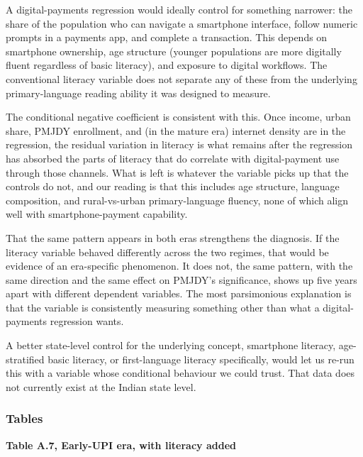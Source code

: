 \documentclass[
]{article}
\begin{document}
A digital-payments regression would ideally control for something
narrower: the share of the population who can navigate a smartphone
interface, follow numeric prompts in a payments app, and complete a
transaction. This depends on smartphone ownership, age structure
(younger populations are more digitally fluent regardless of basic
literacy), and exposure to digital workflows. The conventional literacy
variable does not separate any of these from the underlying
primary-language reading ability it was designed to measure.

The conditional negative coefficient is consistent with this. Once
income, urban share, PMJDY enrollment, and (in the mature era) internet
density are in the regression, the residual variation in literacy is
what remains after the regression has absorbed the parts of literacy
that do correlate with digital-payment use through those channels. What
is left is whatever the variable picks up that the controls do not, and
our reading is that this includes age structure, language composition,
and rural-vs-urban primary-language fluency, none of which align well
with smartphone-payment capability.

That the same pattern appears in both eras strengthens the diagnosis. If
the literacy variable behaved differently across the two regimes, that
would be evidence of an era-specific phenomenon. It does not, the same
pattern, with the same direction and the same effect on PMJDY's
significance, shows up five years apart with different dependent
variables. The most parsimonious explanation is that the variable is
consistently measuring something other than what a digital-payments
regression wants.

A better state-level control for the underlying concept, smartphone
literacy, age-stratified basic literacy, or first-language literacy
specifically, would let us re-run this with a variable whose conditional
behaviour we could trust. That data does not currently exist at the
Indian state level.

\subsubsection{Tables}\label{tables}

\textbf{Table A.7, Early-UPI era, with literacy added}
\end{document}
